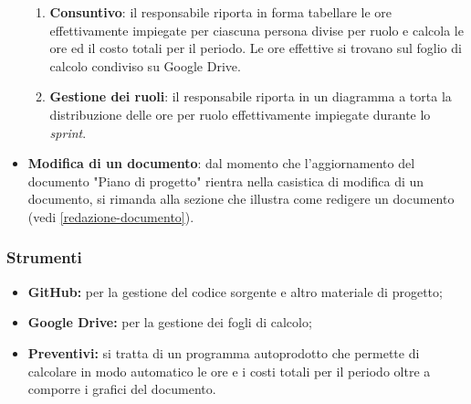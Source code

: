 \begin{itemize}
\begin{enumerate}
		      \item \textbf{Consuntivo}: il responsabile riporta in forma
		            tabellare le ore effettivamente impiegate per ciascuna
		            persona divise per ruolo e calcola le ore ed il costo
		            totali per il periodo. Le ore effettive si trovano sul foglio di calcolo condiviso su Google Drive.

		      \item \textbf{Gestione dei ruoli}: il responsabile riporta in
		            un diagramma a torta la distribuzione delle ore per ruolo
		            effettivamente impiegate durante lo \textit{sprint}.
	      \end{enumerate}

	\item \textbf{Modifica di un documento}: dal momento che
	      l'aggiornamento del documento "Piano di progetto" rientra nella
	      casistica di modifica di un documento, si rimanda alla sezione
	      che illustra come redigere un documento (vedi
	      \ref{redazione-documento}).
\end{itemize}

\subsubsection{Strumenti}
\begin{itemize}
	\item \textbf{GitHub\g:} per la gestione del codice sorgente e altro
	      materiale di progetto;

	\item \textbf{Google Drive:} per la gestione dei fogli di calcolo;

	\item \textbf{Preventivi:} si tratta di un programma autoprodotto che
	      permette di calcolare in modo automatico le ore e i costi totali per
	      il periodo oltre a comporre i grafici del documento.
\end{itemize}
